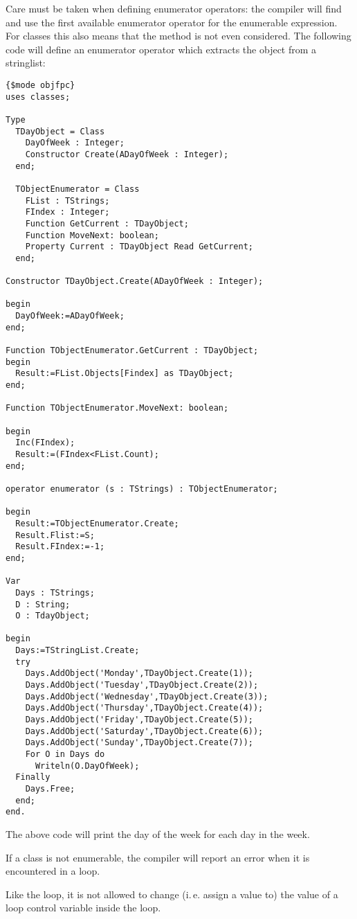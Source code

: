 Care must be taken when defining enumerator operators: the compiler will
find and use the first available enumerator operator for the enumerable
expression. For classes this also means that the  method
is not even considered. The following code will define an enumerator
operator which extracts the object from a stringlist:
\begin{verbatim}
{$mode objfpc}
uses classes;

Type
  TDayObject = Class
    DayOfWeek : Integer;
    Constructor Create(ADayOfWeek : Integer);
  end;

  TObjectEnumerator = Class
    FList : TStrings;
    FIndex : Integer;
    Function GetCurrent : TDayObject;
    Function MoveNext: boolean;
    Property Current : TDayObject Read GetCurrent;
  end;

Constructor TDayObject.Create(ADayOfWeek : Integer);

begin
  DayOfWeek:=ADayOfWeek;
end;

Function TObjectEnumerator.GetCurrent : TDayObject;
begin
  Result:=FList.Objects[Findex] as TDayObject;
end;

Function TObjectEnumerator.MoveNext: boolean;

begin
  Inc(FIndex);
  Result:=(FIndex<FList.Count);
end;

operator enumerator (s : TStrings) : TObjectEnumerator;

begin
  Result:=TObjectEnumerator.Create;
  Result.Flist:=S;
  Result.FIndex:=-1;
end;

Var
  Days : TStrings;
  D : String;
  O : TdayObject;

begin
  Days:=TStringList.Create;
  try
    Days.AddObject('Monday',TDayObject.Create(1));
    Days.AddObject('Tuesday',TDayObject.Create(2));
    Days.AddObject('Wednesday',TDayObject.Create(3));
    Days.AddObject('Thursday',TDayObject.Create(4));
    Days.AddObject('Friday',TDayObject.Create(5));
    Days.AddObject('Saturday',TDayObject.Create(6));
    Days.AddObject('Sunday',TDayObject.Create(7));
    For O in Days do
      Writeln(O.DayOfWeek);
  Finally
    Days.Free;
  end;
end.
\end{verbatim}
The above code will print the day of the week for each day in the week.

If a class is not enumerable, the compiler will report an error when it is
encountered in a  loop.

\begin{remark}
Like the  loop, it is not allowed to change (i.\,e. assign a value to) the value of a
loop control variable inside the loop.
\end{remark}

